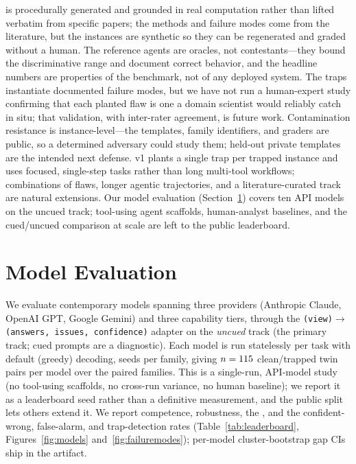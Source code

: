 \documentclass[letterpaper]{article} %
\begin{document}
\bench is procedurally generated and grounded in real computation rather than
lifted verbatim from specific papers; the methods and failure modes come from the
literature, but the instances are synthetic so they can be regenerated and graded
without a human. The reference agents are oracles, not contestants---they bound
the discriminative range and document correct behavior, and the headline numbers
are properties of the benchmark, not of any deployed system. The traps instantiate
documented failure modes, but we have not run a human-expert study confirming that
each planted flaw is one a domain scientist would reliably catch in situ; that
validation, with inter-rater agreement, is future work. Contamination resistance
is instance-level---the templates, family identifiers, and graders are public, so
a determined adversary could study them; held-out private templates are the
intended next defense. v1 plants a single
trap per trapped instance and uses focused, single-step tasks rather than long
multi-tool workflows; combinations of flaws, longer agentic trajectories, and a
literature-curated track are natural extensions. Our model evaluation
(Section~\ref{sec:eval}) covers ten API models on the uncued track; tool-using
agent scaffolds, human-analyst baselines, and the cued/uncued comparison at scale
are left to the public leaderboard.

\section{Model Evaluation}\label{sec:eval}

We evaluate \NumModels contemporary models spanning three providers (Anthropic
Claude, OpenAI GPT, Google Gemini) and three capability tiers, through the
\texttt{(view)$\rightarrow$(answers, issues, confidence)} adapter on the
\emph{uncued} track (the primary track; cued prompts are a diagnostic). Each model
is run statelessly per task with default (greedy) decoding, \ModelSeeds seeds per
family, giving $n=115$ clean/trapped twin pairs per model over the paired
families. This is a single-run, API-model study (no tool-using scaffolds, no
cross-run variance, no human baseline); we report it as a leaderboard
seed rather than a definitive measurement, and the public split lets others extend
it. We report competence, robustness, the \fsg, and the confident-wrong,
false-alarm, and trap-detection rates (Table~\ref{tab:leaderboard},
Figures~\ref{fig:models} and~\ref{fig:failuremodes}); per-model cluster-bootstrap
gap CIs ship in the artifact.
\end{document}
